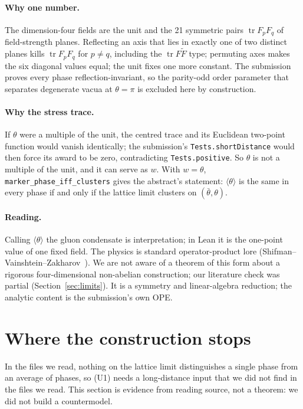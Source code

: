 \documentclass[11pt,a4paper]{article}
\newcommand{\ip}[1]{\langle #1\rangle}
\newcommand{\lean}[1]{\texttt{#1}}
\theoremstyle{plain}
\begin{document}
\paragraph{Why one number.} The dimension-four fields are the unit and the 21 symmetric pairs $\operatorname{tr}F_pF_q$ of field-strength planes. Reflecting an axis that lies in exactly one of two distinct planes kills $\operatorname{tr}F_pF_q$ for $p\neq q$, including the $\operatorname{tr}F\tilde F$ type; permuting axes makes the six diagonal values equal; the unit fixes one more constant. The submission proves every phase reflection-invariant, so the parity-odd order parameter that separates degenerate vacua at $\theta=\pi$ is excluded here by construction.

\paragraph{Why the stress trace.} If $\theta$ were a multiple of the unit, the centred trace and its Euclidean two-point function would vanish identically; the submission's \lean{Tests.shortDistance} would then force its award to be zero, contradicting \lean{Tests.positive}. So $\theta$ is not a multiple of the unit, and it can serve as $w$. With $w=\theta$, \lean{marker\_phase\_iff\_clusters} gives the abstract's statement: $\ip{\theta}$ is the same in every phase if and only if the lattice limit clusters on $(\bar\theta,\theta)$.

\paragraph{Reading.} Calling $\ip{\theta}$ the gluon condensate is interpretation; in Lean it is the one-point value of one fixed field. The physics is standard operator-product lore (Shifman--Vainshtein--Zakharov~\cite{SVZ}). We are not aware of a theorem of this form about a rigorous four-dimensional non-abelian construction; our literature check was partial (Section~\ref{sec:limits}). It is a symmetry and linear-algebra reduction; the analytic content is the submission's own OPE.

\section{Where the construction stops}\label{sec:stops}

In the files we read, nothing on the lattice limit distinguishes a single phase from an average of phases, so (U1) needs a long-distance input that we did not find in the files we read. This section is evidence from reading source, not a theorem: we did not build a countermodel.
\end{document}
